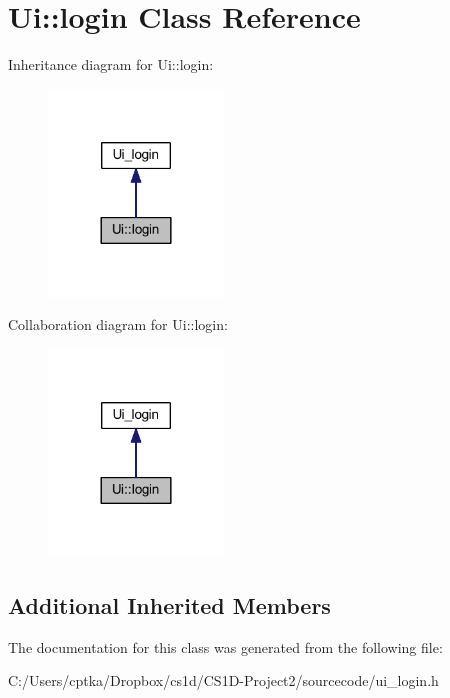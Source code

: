\hypertarget{class_ui_1_1login}{}\section{Ui\+:\+:login Class Reference}
\label{class_ui_1_1login}


Inheritance diagram for Ui\+:\+:login\+:
\nopagebreak
\begin{figure}[H]
\begin{center}
\leavevmode
\includegraphics[width=132pt]{class_ui_1_1login__inherit__graph}
\end{center}
\end{figure}


Collaboration diagram for Ui\+:\+:login\+:
\nopagebreak
\begin{figure}[H]
\begin{center}
\leavevmode
\includegraphics[width=132pt]{class_ui_1_1login__coll__graph}
\end{center}
\end{figure}
\subsection*{Additional Inherited Members}


The documentation for this class was generated from the following file\+:\begin{DoxyCompactItemize}
\item 
C\+:/\+Users/cptka/\+Dropbox/cs1d/\+C\+S1\+D-\/\+Project2/sourcecode/ui\+\_\+login.\+h\end{DoxyCompactItemize}
